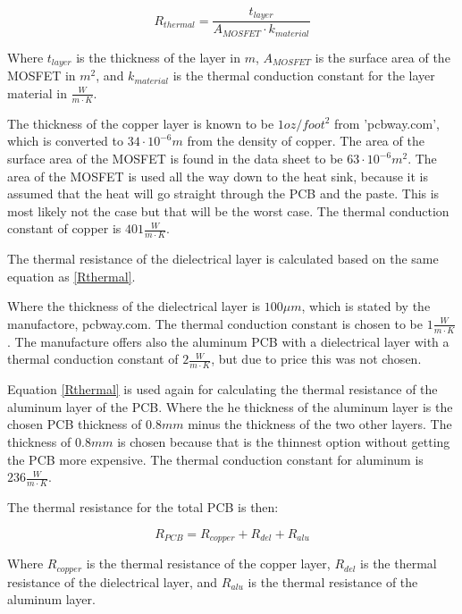     \begin{equation}
        R_{thermal} = \frac{t_{layer}}{A_{MOSFET} \cdot k_{material}} 
        \label{Rthermal}
    \end{equation}
    
Where $t_{layer}$ is the thickness of the layer in $m$, $A_{MOSFET}$ is the surface area of the MOSFET in $m^2$, and $k_{material}$ is the thermal conduction constant for the layer material in $\frac{W}{m \cdot K}$.

The thickness of the copper layer is known to be $1 oz/foot^2$ from 'pcbway.com', which is converted to $34 \cdot 10^{-6} m$ from the density of copper. The area of the surface area of the MOSFET is found in the data sheet to be $63 \cdot 10^{-6} m^2$.\cite{mosfet} The area of the MOSFET is used all the way down to the heat sink, because it is assumed that the heat will go straight through the PCB and the paste. This is most likely not the case but that will be the worst case.
The thermal conduction constant of copper is $401 \frac{W}{m \cdot K}$.\cite{toolbox}

The thermal resistance of the dielectrical layer is calculated based on the same equation as \ref{Rthermal}.

Where the thickness of the dielectrical layer is $100 \mu m$, which is stated by the manufactore, pcbway.com. The thermal conduction constant is chosen to be $1 \frac{W}{m \cdot K}$. The manufacture offers also the aluminum PCB with a dielectrical layer with a thermal conduction constant of $2 \frac{W}{m \cdot K}$, but due to price this was not chosen.

Equation \ref{Rthermal} is used again for calculating the thermal resistance of the aluminum layer of the PCB.
Where the he thickness of the aluminum layer is the chosen PCB thickness of $0.8 mm$ minus the thickness of the two other layers. The thickness of $0.8 mm$ is chosen because that is the thinnest option without getting the PCB more expensive. The thermal conduction constant for aluminum is $236 \frac{W}{m \cdot K}$.\cite{toolbox}

The thermal resistance for the total PCB is then:

    \begin{equation}
        R_{PCB} = R_{copper} + R_{del} + R_{alu}
        \label{RPCB}
    \end{equation}

Where $R_{copper}$ is the thermal resistance of the copper layer, $R_{del}$ is the thermal resistance of the dielectrical layer, and $R_{alu}$ is the thermal resistance of the aluminum layer.

